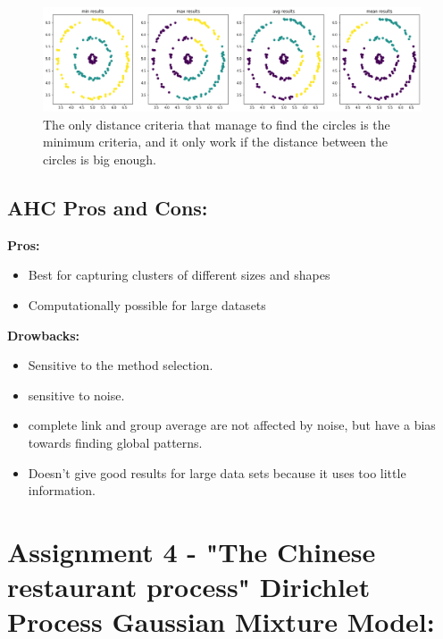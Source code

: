 \documentclass[12pt, a4paper]{paper}
\begin{document}
\begin{figure}[h!]
\centering
\includegraphics[scale=0.4]{cir_hir.png}
\caption{The only distance criteria that manage to find the circles is the minimum criteria, and it only work if the distance between the circles is big enough.}
\label{fig:Circular_3}
\end{figure}


\newpage

\subsection*{AHC Pros and Cons:}

\textbf{Pros:} 
\begin{itemize}
    \item Best for capturing clusters of different sizes and shapes
    \item Computationally possible for large datasets
\end{itemize}
\textbf{Drowbacks:}

\begin{itemize}
    \item Sensitive to the method selection.
    \item sensitive to noise.
    \item complete link and group average are not affected by noise, but have a bias towards finding global patterns.
    \item Doesn't give good results for large data sets because it uses too little information.
\end{itemize}

\newpage

\section*{Assignment 4 - "The Chinese restaurant process" Dirichlet Process Gaussian Mixture Model:}
\end{document}
